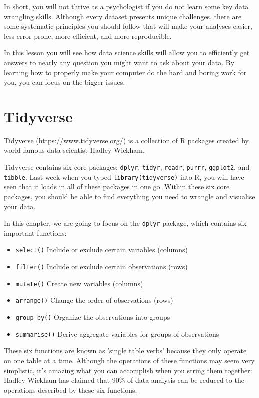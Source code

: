 \documentclass[]{book}
\providecommand{\tightlist}{%
  \setlength{\itemsep}{0pt}\setlength{\parskip}{0pt}}
\begin{document}
In short, you will not thrive as a psychologist if you do not learn some key data wrangling skills. Although every dataset presents unique challenges, there are some systematic principles you should follow that will make your analyses easier, less error-prone, more efficient, and more reproducible.

In this lesson you will see how data science skills will allow you to efficiently get answers to nearly any question you might want to ask about your data. By learning how to properly make your computer do the hard and boring work for you, you can focus on the bigger issues.

\hypertarget{tidyverse}{%
\section{Tidyverse}\label{tidyverse}}

Tidyverse (\url{https://www.tidyverse.org/}) is a collection of R packages created by world-famous data scientist Hadley Wickham.

Tidyverse contains six core packages: \texttt{dplyr}, \texttt{tidyr}, \texttt{readr}, \texttt{purrr}, \texttt{ggplot2}, and \texttt{tibble}. Last week when you typed \texttt{library(tidyverse)} into R, you will have seen that it loads in all of these packages in one go. Within these six core packages, you should be able to find everything you need to wrangle and visualise your data.

In this chapter, we are going to focus on the \texttt{dplyr} package, which contains six important functions:

\begin{itemize}
\tightlist
\item
  \texttt{select()} Include or exclude certain variables (columns)
\item
  \texttt{filter()} Include or exclude certain observations (rows)
\item
  \texttt{mutate()} Create new variables (columns)
\item
  \texttt{arrange()} Change the order of observations (rows)
\item
  \texttt{group\_by()} Organize the observations into groups
\item
  \texttt{summarise()} Derive aggregate variables for groups of observations
\end{itemize}

These six functions are known as 'single table verbs' because they only operate on one table at a time. Although the operations of these functions may seem very simplistic, it's amazing what you can accomplish when you string them together: Hadley Wickham has claimed that 90\% of data analysis can be reduced to the operations described by these six functions.
\end{document}
